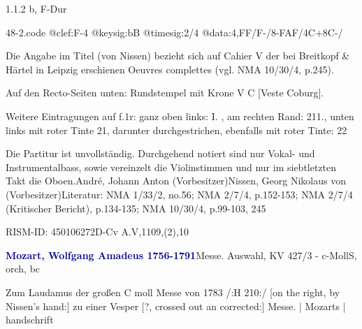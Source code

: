 \documentclass[a4paper, twocolumn, 11pt]{book}
\begin{document}
\newline %
\par 1.1.2  b, F-Dur  
\begin{filecontents*}{48-2.code}
@clef:F-4
@keysig:bB
@timesig:2/4
@data:4,FF/F-/8-{FAF}/4C+8C-/
\end{filecontents*}

\newline %
\par Die Angabe im Titel (von Nissen) bezieht sich auf Cahier V der bei Breitkopf \& Härtel in Leipzig erschienen {\textquotedbl}Oeuvres complettes{\textquotedbl} (vgl. NMA 10/30/4, p.245).
\par Auf den Recto-Seiten unten: Rundstempel mit Krone {\textquotedbl}V C{\textquotedbl} [Veste Coburg].
\par Weitere Eintragungen auf f.1r: ganz oben links: {\textquotedbl}I.{\textquotedbl} , am rechten Rand: {\textquotedbl}211.{\textquotedbl}, unten links mit roter Tinte {\textquotedbl}21{\textquotedbl}, darunter durchgestrichen, ebenfalls mit roter Tinte: {\textquotedbl}22{\textquotedbl}
\par Die Partitur ist unvollständig. Durchgehend notiert sind nur Vokal- und Instrumentalbass, sowie vereinzelt die Violinstimmen und nur im siebtletzten Takt die Oboen.\newline André, Johann Anton  (Vorbesitzer)\newline Nissen, Georg Nikolaus von  (Vorbesitzer)\newline Literatur: NMA  1/33/2, no.56; NMA  2/7/4, p.152-153; NMA  2/7/4 (Kritischer Bericht), p.134-135; NMA  10/30/4, p.99-103, 245
\par RISM-ID: 450106272\newline D-Cv  A.V,1109,(2),10
\par \vspace{16pt} \textcolor{darkblue}{\textbf{Mozart, Wolfgang Amadeus  1756-1791}}\hfillplus{[49]}\newline Messe. Auswahl, KV 427/3 - c-Moll\newline S, orch, bc
\par \begin{itshape} Zum Laudamus der großen C moll Messe von 1783 /:H 210:/ [on the right, by Nissen's hand:] zu einer Vesper [?, crossed out an corrected:] Messe. | Mozarts | handschrift\end{itshape} 
\end{document}

